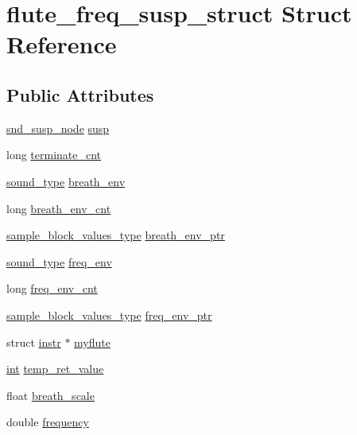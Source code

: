 \hypertarget{structflute__freq__susp__struct}{}\section{flute\+\_\+freq\+\_\+susp\+\_\+struct Struct Reference}
\label{structflute__freq__susp__struct}
\subsection*{Public Attributes}
\begin{DoxyCompactItemize}
\item 
\hyperlink{sound_8h_a6b268203688a934bd798ceb55f85d4c0}{snd\+\_\+susp\+\_\+node} \hyperlink{structflute__freq__susp__struct_af4f88fabb13a789f3ee7d49c0b5c8fa6}{susp}
\item 
long \hyperlink{structflute__freq__susp__struct_a17a672446696cda74dd06f0052dbaa9f}{terminate\+\_\+cnt}
\item 
\hyperlink{sound_8h_a792cec4ed9d6d636d342d9365ba265ea}{sound\+\_\+type} \hyperlink{structflute__freq__susp__struct_a2accb7945fd8fdc4dcb220340e0a7837}{breath\+\_\+env}
\item 
long \hyperlink{structflute__freq__susp__struct_acf92b37d34c87dae733ccc1e730c71fb}{breath\+\_\+env\+\_\+cnt}
\item 
\hyperlink{sound_8h_a83d17f7b465d1591f27cd28fc5eb8a03}{sample\+\_\+block\+\_\+values\+\_\+type} \hyperlink{structflute__freq__susp__struct_ac7020eab2bf35a15b309e40895a38b4c}{breath\+\_\+env\+\_\+ptr}
\item 
\hyperlink{sound_8h_a792cec4ed9d6d636d342d9365ba265ea}{sound\+\_\+type} \hyperlink{structflute__freq__susp__struct_a1fad25ce45fe2841cdbe55acb2ca6572}{freq\+\_\+env}
\item 
long \hyperlink{structflute__freq__susp__struct_a5793a4e58435810d358f95e608d2232f}{freq\+\_\+env\+\_\+cnt}
\item 
\hyperlink{sound_8h_a83d17f7b465d1591f27cd28fc5eb8a03}{sample\+\_\+block\+\_\+values\+\_\+type} \hyperlink{structflute__freq__susp__struct_ade933e428bd6770c80b6d785c0e8321a}{freq\+\_\+env\+\_\+ptr}
\item 
struct \hyperlink{structinstr}{instr} $\ast$ \hyperlink{structflute__freq__susp__struct_a70395e322dc44af765d17f8b710dc1bb}{myflute}
\item 
\hyperlink{xmltok_8h_a5a0d4a5641ce434f1d23533f2b2e6653}{int} \hyperlink{structflute__freq__susp__struct_a56811b80661ab7e1ef5769547c40a043}{temp\+\_\+ret\+\_\+value}
\item 
float \hyperlink{structflute__freq__susp__struct_a4aeb093b436f81a4bcae7954747bda95}{breath\+\_\+scale}
\item 
double \hyperlink{structflute__freq__susp__struct_a067087bd61f727708f92dc5980492b2e}{frequency}
\end{DoxyCompactItemize}


